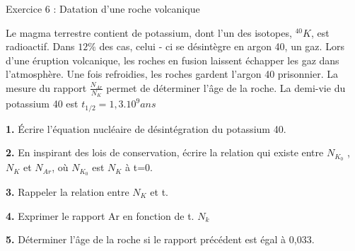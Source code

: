\documentclass[12pt, french]{article}
\begin{document}
\begin{Box2}{Exercice 6 : Datation d’une roche volcanique }

	Le magma terrestre contient de potassium, dont l’un des isotopes, $^{40}K$, est radioactif. Dans $12\%$
des cas, celui - ci se désintègre en argon 40, un gaz. Lors d’une éruption volcanique, les roches en
fusion laissent échapper les gaz dans l’atmosphère. Une fois refroidies, les roches gardent l’argon 40
prisonnier. La mesure du rapport $\frac{N_{Ar}}{N_{K}}$ permet de déterminer l’âge de la roche. La demi-vie du potassium 40 est $t_{1/2} = 1,3.10^9ans$

\textbf{1. }Écrire l’équation nucléaire de désintégration du potassium 40.

\textbf{2. }En inspirant des lois de conservation, écrire la relation qui existe entre $N_{K_0}$ , $N_K$ et $N_{Ar}$, où $N_{K_0}$ est $N_K$ à t=0.

\textbf{3. } Rappeler la relation entre $N_K$ et t.

\textbf{4.} Exprimer le rapport Ar en fonction de t. $N_k$

\textbf{5.} Déterminer l’âge de la roche si le rapport précédent est égal à 0,033.

\end{Box2}


\end{document}
